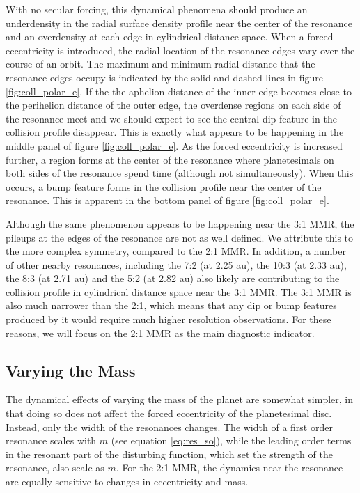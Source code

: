 With no secular forcing, this dynamical phenomena should produce an underdensity in the radial surface density profile near the 
center of the resonance and an overdensity at each edge in cylindrical distance space. When a forced eccentricity is introduced, 
the radial location of the resonance edges vary over the course of an orbit. The maximum and minimum radial distance that the 
resonance edges occupy is indicated by the solid and dashed lines in figure \ref{fig:coll_polar_e}. If the the aphelion distance of 
the inner edge becomes close to the perihelion distance of the outer edge, the overdense regions on each side of the resonance 
meet and we should expect to see the central dip feature in the collision profile disappear. This is exactly what appears to be 
happening in the middle panel of figure \ref{fig:coll_polar_e}. As the forced eccentricity is increased further, a region forms at the 
center of the resonance where planetesimals on both sides of the resonance spend time (although not simultaneously). When 
this occurs, a bump feature forms in the collision profile near the center of the resonance. This is apparent in the bottom panel of 
figure \ref{fig:coll_polar_e}.

Although the same phenomenon appears to be happening near the 3:1 MMR, the pileups at the edges of the resonance are not 
as well defined. We attribute this to the more complex symmetry, compared to the 2:1 MMR. In addition, a number of other 
nearby resonances, including the 7:2 (at 2.25 au), the 10:3 (at 2.33 au), the 8:3 (at 2.71 au) and the 5:2 (at 2.82 au) also likely 
are contributing to the collision profile in cylindrical distance space near the 3:1 MMR. The 3:1 MMR is also much narrower than 
the 2:1, which means that any dip or bump features produced by it would require much higher resolution observations. For these 
reasons, we will focus on the 2:1 MMR as the main diagnostic indicator.

\subsection{Varying the Mass}

The dynamical effects of varying the mass of the planet are somewhat simpler, in that doing so does not affect the forced 
eccentricity of the planetesimal disc. Instead, only the width of the resonances changes. The width of a first order resonance 
scales with $m$ (see equation \ref{eq:res_so}), while the leading order terms in the resonant part of the disturbing function, 
which set the strength of the resonance, also scale as $m$. For the 2:1 MMR, the dynamics near the resonance are equally 
sensitive to changes in eccentricity and mass.

